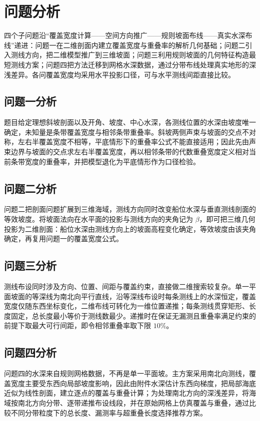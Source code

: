 \section{问题分析}

四个子问题沿“覆盖宽度计算——空间方向推广——规则坡面布线——真实水深布线”递进：问题一在二维剖面内建立覆盖宽度与重叠率的解析几何基础；问题二引入测线方向，把二维模型推广到三维坡面；问题三利用规则坡面的几何特征构造最短测线方案；问题四把方法迁移到网格水深数据，通过分带布线处理真实地形的深浅差异。各问覆盖宽度均采用水平投影口径，可与水平测线间距直接比较。

\subsection{问题一分析}

题目给定理想斜坡剖面以及开角、坡度、中心水深，各测线位置的水深由坡度唯一确定，未知量是条带覆盖宽度与相邻条带重叠率。斜坡两侧声束与坡面的交点不对称，左右半覆盖宽度不相等，平底情形下的重叠率公式不能直接适用；因此先由声束边界与坡面的交点求左右半覆盖宽度，再以相邻条带的代数重叠宽度定义相对当前条带宽度的重叠率，并把模型退化为平底情形作为口径检验。

\subsection{问题二分析}

问题二把剖面问题扩展到三维海域，测线方向同时改变船位水深与垂直测线剖面的等效坡度。将坡面法向在水平面的投影与测线方向的夹角记为 $\beta$，即可把三维几何投影为二维剖面：船位水深由测线方向上的坡面高程变化确定，等效坡度由该夹角确定，再复用问题一的覆盖宽度公式。

\subsection{问题三分析}

测线布设同时涉及方向、位置、间距与覆盖约束，直接做二维搜索较复杂。单一平面坡面的等深线为南北向平行直线，沿等深线布设时每条测线上的水深恒定，覆盖宽度仅随东西坐标变化，二维布线可转化为一维位置递推；每条测线贯穿矩形、长度固定，总长度最小等价于测线数最少。递推时在保证无漏测且重叠率满足约束的前提下取最大可行间距，即令相邻重叠率取下限 $10\%$。

\subsection{问题四分析}

问题四的水深来自规则网格数据，不再是单一平面坡。主方案采用南北向测线，覆盖宽度主要受东西向局部坡度影响，因此由附件水深估计东西向梯度，把局部海底近似为线性剖面，建立逐点的覆盖与重叠计算；为处理南北方向的深浅差异，将海域按南北方向分带、逐带递推布设线段，并在原始网格上仿真覆盖与重叠，通过比较不同分带粒度下的总长度、漏测率与超重叠长度选择推荐方案。
